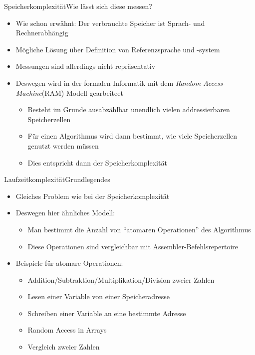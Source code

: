 
\begin{frame}{Speicherkomplexität}{Wie lässt sich diese messen?}
    \begin{itemize}[<+->]
        \item Wie schon erwähnt: Der verbrauchte Speicher ist Sprach- und Rechnerabhängig
        \item Mögliche Lösung über Definition von Referenzsprache und -system
        \item Messungen sind allerdings nicht repräsentativ
        \item Deswegen wird in der formalen Informatik mit dem \textit{Random-Access-Machine}(RAM) Modell gearbeiteet
        \begin{itemize}
            \item Besteht im Grunde ausabzählbar unendlich vielen addressierbaren Speicherzellen
            \item Für einen Algorithmus wird dann bestimmt, wie viele Speicherzellen genutzt werden müssen
            \item Dies entspricht dann der Speicherkomplexität
        \end{itemize}
    \end{itemize}
\end{frame}

\begin{frame}{Laufzeitkomplexität}{Grundlegendes}
    \begin{itemize}[<+->]
        \item Gleiches Problem wie bei der Speicherkomplexität
        \item Deswegen hier ähnliches Modell:
        \begin{itemize}
            \item Man bestimmt die Anzahl von "`atomaren Operationen"' des Algorithmus
            \item Diese Operationen sind vergleichbar mit Assembler-Befehlsrepertoire
        \end{itemize}
        \item Beispiele für atomare Operationen:
        \begin{itemize}
            \item Addition/Subtraktion/Multiplikation/Division zweier Zahlen
            \item Lesen einer Variable von einer Speicheradresse
            \item Schreiben einer Variable an eine bestimmte Adresse
            \item Random Access in Arrays
            \item Vergleich zweier Zahlen
        \end{itemize}
    \end{itemize}
\end{frame}
